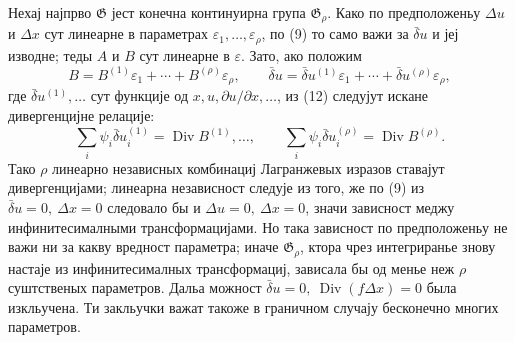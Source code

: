 ﻿\documentclass[11pt]{article}
\providecommand{\G}{\mathfrak G}
\providecommand{\eps}{\varepsilon}
\providecommand{\D}{\Delta}
\providecommand{\p}{\partial}
\DeclareMathOperator{\Div}{Div}
\providecommand{\bd}{\bar{\delta}}
\begin{document}
Нехај најпрво \(\G\) јест конечна континуирна група \(\G_\rho\). Како по предположеньу \(\D u\) и \(\D x\) сут линеарне в параметрах \(\eps_1,\ldots,\eps_\rho\), по (9) то само важи за \(\bd u\) и јеј изводне; теды \(A\) и \(B\) сут линеарне в \(\eps\). Зато, ако положим
\[
B=B^{(1)}\eps_1+\cdots+B^{(\rho)}\eps_\rho,\qquad
\bd u=\bd u^{(1)}\eps_1+\cdots+\bd u^{(\rho)}\eps_\rho,
\]
где \(\bd u^{(1)},\ldots\) сут функције од \(x,u,\p u/\p x,\ldots\), из (12) следујут искане дивергенцијне релације:
\begin{equation}
\sum_i\psi_i\bd u_i^{(1)}=\Div B^{(1)},\ldots,\qquad
\sum_i\psi_i\bd u_i^{(\rho)}=\Div B^{(\rho)}.
\tag{13}
\end{equation}
Тако \(\rho\) линеарно независных комбинациј Лагранжевых изразов ставајут дивергенцијами; линеарна независност следује из того, же по (9) из \(\bd u=0,\ \D x=0\) следовало бы и \(\D u=0,\ \D x=0\), значи зависност меджу инфинитесималными трансформацијами. Но така зависност по предположеньу не важи ни за какву вредност параметра; иначе \(\G_\rho\), ктора чрез интегриранье знову настаје из инфинитесималных трансформациј, зависала бы од менье неж \(\rho\) суштственых параметров. Дальа можност \(\bd u=0,\ \Div(f\D x)=0\) была изкльучена. Ти закльучки важат такоже в граничном случају бесконечно многих параметров.
\end{document}
